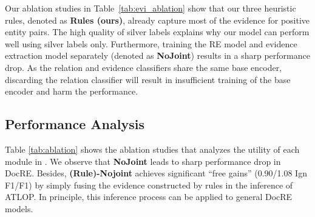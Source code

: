 Our ablation studies in Table~\ref{tab:evi_ablation} show that our three heuristic rules, denoted as \textbf{Rules (ours)}, already capture most of the evidence for positive entity pairs. The high quality of silver labels explains why our model can perform well using silver labels only.
Furthermore, training the RE model and evidence extraction model separately (denoted as \textbf{NoJoint}) results in a sharp performance drop. 
As the relation and evidence classifiers share the same base encoder, discarding the relation classifier will result in insufficient training of the base encoder and harm the performance.

\begin{table}[t]
\centering
{}
    \upv
    \caption{Ablation study for evidence extraction.}
    \label{tab:evi_ablation}
    \downv
\end{table}

\subsection{Performance Analysis}



 Table \ref{tab:ablation} shows the ablation studies that analyzes the utility of each module in \ours.
We observe that \textbf{NoJoint} leads to sharp performance drop in DocRE.
Besides, \textbf{\ours (Rule)-Nojoint} achieves significant ``free gains'' (0.90/1.08 Ign F1/F1) by simply fusing the evidence constructed by rules in the inference of ATLOP. In principle, this inference process can be applied to general DocRE models.



